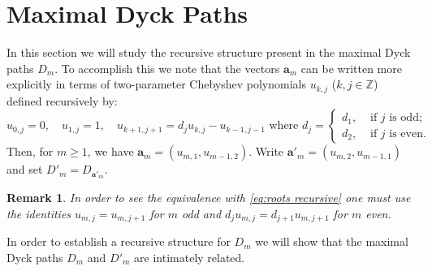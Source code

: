 \documentclass{amsart}
\newtheorem{remark}[theorem]{Remark}
\newcommand{\bfa}{\mathbf{a}}
\newcommand{\ZZ}{\mathbb{Z}}
\begin{document}
\section{Maximal Dyck Paths}

In this section we will study the recursive structure present in the maximal Dyck paths $D_m$.  To accomplish this we note that the vectors $\bfa_m$ can be written more explicitly in terms of two-parameter Chebyshev polynomials $u_{k,j}$ ($k,j\in \ZZ$) defined recursively by: 
\begin{equation}\label{eq:chebyshev}
  u_{0,j}=0,\quad
  u_{1,j}=1,\quad
  u_{k+1,j+1}=d_ju_{k,j}-u_{k-1,j-1} \text{ where $d_j=\begin{cases} d_1, & \text{ if $j$ is odd;}\\ d_2, & \text{ if $j$ is even.}\end{cases}$}
\end{equation}
Then, for $m\ge 1$, we have $\bfa_m=(u_{m,1},u_{m-1,2})$.  Write $\bfa'_m=(u_{m,2},u_{m-1,1})$ and set $D'_m=D_{\bfa'_m}$.  
\begin{remark}
  In order to see the equivalence with \eqref{eq:roots recursive} one must use the identities $u_{m,j}=u_{m,j+1}$ for $m$ odd and $d_ju_{m,j}=d_{j+1}u_{m,j+1}$ for $m$ even.
\end{remark}
In order to establish a recursive structure for $D_m$ we will show that the maximal Dyck paths $D_m$ and $D'_m$ are intimately related.
\end{document}
